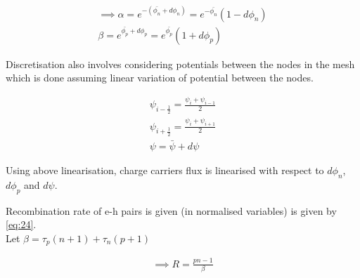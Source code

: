 \begin{align*}
\implies \alpha = e^{-(\bar{\phi_n} + d\phi_n)} = e^{-\bar{\phi_n}} (1 - d\phi_n)  \\
\beta = e^{\bar{\phi_p} + d\phi_p} = e^{\bar{\phi_p}} (1 + d\phi_p)
\tag{2.12} \label{eq:cont_linear}
\end{align*}

Discretisation also involves considering potentials between the nodes in the mesh which is done assuming linear variation of potential between the nodes.

\begin{align*}
\psi_{i-\frac{1}{2}} = \frac{\psi_{i} + \psi_{i-1}}{2} \\
\psi_{i+\frac{1}{2}} = \frac{\psi_{i} + \psi_{i+1}}{2} \\
\psi = \bar{\psi} + d\psi
\end{align*}

Using above linearisation, charge carriers flux is linearised with respect to $d\phi_n$, $d\phi_p$ and $d\psi$.

\iffalse
\begin{align*}
p \approx \bar{p} (1 - (d\psi - d\phi_p))  \\
n \approx \bar{n} (1 + (d\psi - d\phi_n)) 
\end{align*}

\begin{align*}
\vec{J_n} = -n\nabla\phi_n = -\bar{n} (1 + (d\psi - d\phi_n)) \nabla( \bar{\phi_n} + d\phi_n ) = -\bar{n}( (d\psi - d\phi_n) \nabla(\bar{\phi_n}) + \nabla(\bar{\phi_n}) +\nabla(d\phi_n))  \\
\vec{J_p} = -\mu_p p \nabla\phi_p = -\mu_p \bar{p} (1 - (d\psi - d\phi_p)) \nabla( \bar{\phi_p} + d\phi_p ) = -\mu_p \bar{p}( -(d\psi - d\phi_p) \nabla(\bar{\phi_p}) + \nabla(\bar{\phi_p}) +\nabla(d\phi_p))\\
R = \bar{R} + \frac{\partial R}{\partial \psi} d\psi + \frac{\partial R}{\partial \phi_p} d\psi_p + \frac{\partial R}{\partial \phi_n} d\psi_n
\tag{2.12} \label{eq:cont_linear}
\end{align*}

\fi

Recombination rate of e-h pairs is given (in normalised variables) is given by \eqref{eq:24}.\\

Let $\beta = \tau_p (n+1) + \tau_n (p+1)$ 

\begin{align*}
\implies R = \frac{pn-1}{\beta}
\end{align*}

